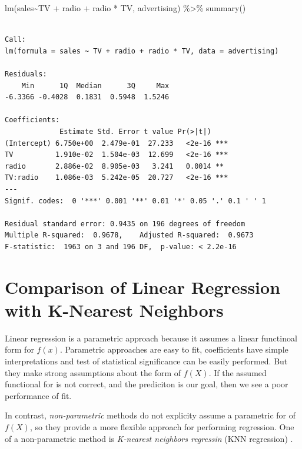 \documentclass[
  letterpaper,
  DIV=11,
  numbers=noendperiod]{scrreprt}
\newenvironment{Shaded}{\begin{snugshade}}{\end{snugshade}}
\newcommand{\FunctionTok}[1]{\textcolor[rgb]{0.02,0.16,0.49}{#1}}
\newcommand{\NormalTok}[1]{\textcolor[rgb]{0.33,0.33,0.33}{#1}}
\newcommand{\SpecialCharTok}[1]{\textcolor[rgb]{0.00,0.46,0.62}{#1}}
\begin{document}
\begin{Shaded}
\begin{Highlighting}[]
\FunctionTok{lm}\NormalTok{(sales}\SpecialCharTok{\textasciitilde{}}\NormalTok{TV }\SpecialCharTok{+}\NormalTok{ radio }\SpecialCharTok{+}\NormalTok{ radio }\SpecialCharTok{*}\NormalTok{ TV, advertising) }\SpecialCharTok{\%\textgreater{}\%} \FunctionTok{summary}\NormalTok{()}
\end{Highlighting}
\end{Shaded}

\begin{verbatim}

Call:
lm(formula = sales ~ TV + radio + radio * TV, data = advertising)

Residuals:
    Min      1Q  Median      3Q     Max 
-6.3366 -0.4028  0.1831  0.5948  1.5246 

Coefficients:
             Estimate Std. Error t value Pr(>|t|)    
(Intercept) 6.750e+00  2.479e-01  27.233   <2e-16 ***
TV          1.910e-02  1.504e-03  12.699   <2e-16 ***
radio       2.886e-02  8.905e-03   3.241   0.0014 ** 
TV:radio    1.086e-03  5.242e-05  20.727   <2e-16 ***
---
Signif. codes:  0 '***' 0.001 '**' 0.01 '*' 0.05 '.' 0.1 ' ' 1

Residual standard error: 0.9435 on 196 degrees of freedom
Multiple R-squared:  0.9678,    Adjusted R-squared:  0.9673 
F-statistic:  1963 on 3 and 196 DF,  p-value: < 2.2e-16
\end{verbatim}

\hypertarget{comparison-of-linear-regression-with-k-nearest-neighbors}{%
\section{Comparison of Linear Regression with K-Nearest
Neighbors}\label{comparison-of-linear-regression-with-k-nearest-neighbors}}

Linear regression is a parametric approach because it assumes a linear
functinoal form for \(f(x)\). Parametric approaches are easy to fit,
coefficients have simple interpretations and test of statistical
significance can be easily performed. But they make strong assumptions
about the form of \(f(X)\). If the assumed functional for is not
correct, and the prediciton is our goal, then we see a poor performance
of fit.

In contrast, \emph{non-parametric} methods do not explicity assume a
parametric for of \(f(X)\), so they provide a more flexible approach for
performing regression. One of a non-parametric method is \emph{K-nearest
neighbors regressin} (KNN regression) .
\end{document}
